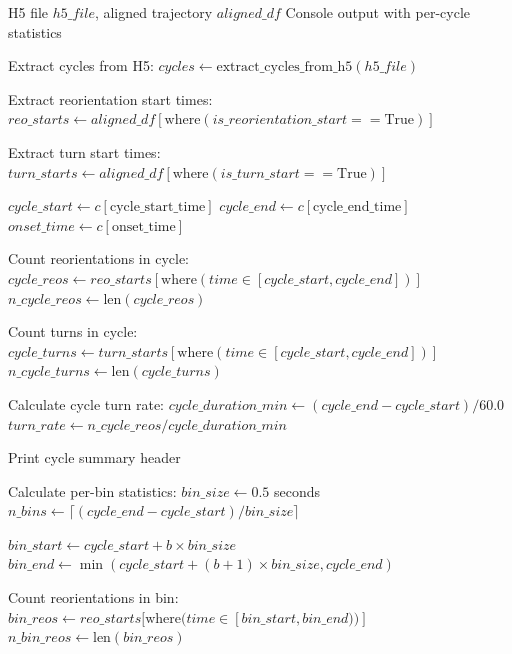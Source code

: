 \documentclass[
  11pt,
]{article}
\begin{document}
\begin{algorithm}[H]
\caption{Calculate Per-Cycle Statistics}
\label{alg:per-cycle-stats}
\begin{algorithmic}[1]
\REQUIRE H5 file $h5\_file$, aligned trajectory $aligned\_df$
\ENSURE Console output with per-cycle statistics

\STATE Extract cycles from H5:
\STATE \quad $cycles \leftarrow \text{extract\_cycles\_from\_h5}(h5\_file)$

\STATE Extract reorientation start times:
\STATE \quad $reo\_starts \leftarrow aligned\_df[\text{where}(is\_reorientation\_start == \text{True})]$

\STATE Extract turn start times:
\STATE \quad $turn\_starts \leftarrow aligned\_df[\text{where}(is\_turn\_start == \text{True})]$

    \STATE $cycle\_start \leftarrow c[\text{cycle\_start\_time}]$
    \STATE $cycle\_end \leftarrow c[\text{cycle\_end\_time}]$
    \STATE $onset\_time \leftarrow c[\text{onset\_time}]$
    
    \STATE Count reorientations in cycle:
    \STATE \quad $cycle\_reos \leftarrow reo\_starts[\text{where}(time \in [cycle\_start, cycle\_end])]$
    \STATE \quad $n\_cycle\_reos \leftarrow \text{len}(cycle\_reos)$
    
    \STATE Count turns in cycle:
    \STATE \quad $cycle\_turns \leftarrow turn\_starts[\text{where}(time \in [cycle\_start, cycle\_end])]$
    \STATE \quad $n\_cycle\_turns \leftarrow \text{len}(cycle\_turns)$
    
    \STATE Calculate cycle turn rate:
    \STATE \quad $cycle\_duration\_min \leftarrow (cycle\_end - cycle\_start) / 60.0$
    \STATE \quad $turn\_rate \leftarrow n\_cycle\_reos / cycle\_duration\_min$
    
    \STATE Print cycle summary header
    
    \STATE Calculate per-bin statistics:
    \STATE \quad $bin\_size \leftarrow 0.5$ seconds
    \STATE \quad $n\_bins \leftarrow \lceil (cycle\_end - cycle\_start) / bin\_size \rceil$
    
        \STATE $bin\_start \leftarrow cycle\_start + b \times bin\_size$
        \STATE $bin\_end \leftarrow \min(cycle\_start + (b+1) \times bin\_size, cycle\_end)$
        
        \STATE Count reorientations in bin:
        \STATE \quad $bin\_reos \leftarrow reo\_starts[\text{where}(time \in [bin\_start, bin\_end))]$
        \STATE \quad $n\_bin\_reos \leftarrow \text{len}(bin\_reos)$
        

\end{algorithmic}
\end{algorithm}
\end{document}
